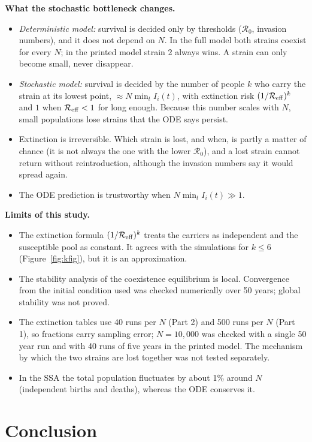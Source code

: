 \documentclass[11pt,a4paper]{article}
\newcommand{\R}{\mathcal R_0}
\begin{document}
\textbf{What the stochastic bottleneck changes.}
\begin{itemize}
  \item \emph{Deterministic model:} survival is decided only by thresholds ($\R$, invasion numbers), and it does not depend on $N$. In the full model both strains coexist for every $N$; in the printed model strain 2 always wins. A strain can only become small, never disappear.
  \item \emph{Stochastic model:} survival is decided by the number of people $k$ who carry the strain at its lowest point, $\approx N\min_tI_i(t)$, with extinction risk $(1/\mathcal R_{\rm eff})^k$ and $1$ when $\mathcal R_{\rm eff}<1$ for long enough. Because this number scales with $N$, small populations lose strains that the ODE says persist.
  \item Extinction is irreversible. Which strain is lost, and when, is partly a matter of chance (it is not always the one with the lower $\R$), and a lost strain cannot return without reintroduction, although the invasion numbers say it would spread again.
  \item The ODE prediction is trustworthy when $N\min_t I_i(t)\gg1$.
\end{itemize}

\textbf{Limits of this study.}
\begin{itemize}
  \item The extinction formula $(1/\mathcal R_{\rm eff})^k$ treats the carriers as independent and the susceptible pool as constant. It agrees with the simulations for $k\le 6$ (Figure~\ref{fig:kfig}), but it is an approximation.
  \item The stability analysis of the coexistence equilibrium is local. Convergence from the initial condition used was checked numerically over 50 years; global stability was not proved.
  \item The extinction tables use 40 runs per $N$ (Part 2) and 500 runs per $N$ (Part 1), so fractions carry sampling error; $N=10{,}000$ was checked with a single 50 year run and with 40 runs of five years in the printed model. The mechanism by which the two strains are lost together was not tested separately.
  \item In the SSA the total population fluctuates by about 1\% around $N$ (independent births and deaths), whereas the ODE conserves it.
\end{itemize}

\section{Conclusion}
\end{document}
